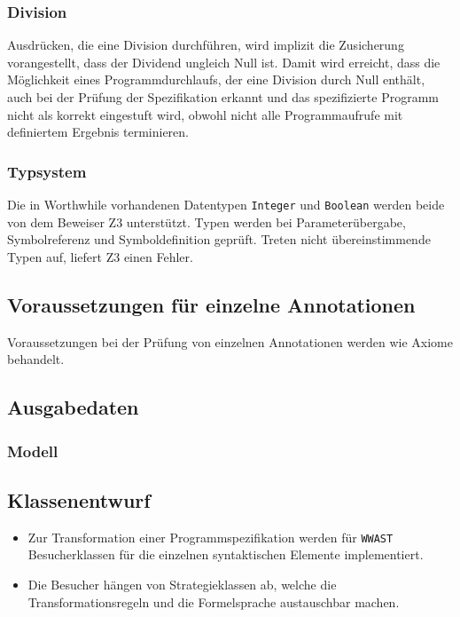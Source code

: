 \subsubsection{Division}%

Ausdrücken, die eine Division durchführen, wird implizit die Zusicherung
vorangestellt, dass der Dividend ungleich Null ist. Damit wird erreicht, dass
die Möglichkeit eines Programmdurchlaufs, der eine Division durch Null enthält,
auch bei der Prüfung der Spezifikation erkannt und das spezifizierte Programm
nicht als korrekt eingestuft wird, obwohl nicht alle Programmaufrufe mit
definiertem Ergebnis terminieren.%

\subsubsection{Typsystem}%

Die in Worthwhile vorhandenen Datentypen \texttt{Integer} und
\texttt{Boolean} werden beide von dem Beweiser Z3 unterstützt. Typen
werden bei Parameterübergabe, Symbolreferenz und Symboldefinition
geprüft. Treten nicht übereinstimmende Typen auf, liefert Z3 einen
Fehler.%

\subsection{Voraussetzungen für einzelne Annotationen}%


Voraussetzungen bei der Prüfung von einzelnen Annotationen werden wie
Axiome behandelt.%

\subsection{Ausgabedaten}%

\subsubsection{Modell}%

\subsection{Klassenentwurf}%

\begin{itemize}%

    \item Zur Transformation einer Programmspezifikation werden für
    \texttt{WWAST} Besucherklassen für die einzelnen syntaktischen
    Elemente implementiert.%

    \item Die Besucher hängen von Strategieklassen ab, welche die
    Transformationsregeln und die Formelsprache austauschbar machen.%


\end{itemize}%

